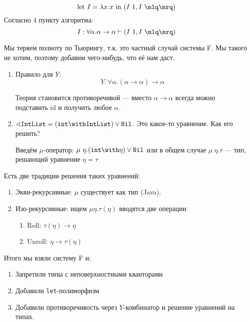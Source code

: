 \begin{example}
    \[\mathrm{let}\ I = \lambda x.x\ \mathrm{in}\ (I\ 1, I\ \mlq\mrq)\]
    Согласно 4 пункту алгоритма:
    \[I : \forall \alpha.\alpha \to \alpha \vdash (I\ 1, I\ \mlq\mrq)\]
\end{example}

Мы теряем полноту по Тьюрингу, т.к. это частный случай системы F. Мы такого не хотим, поэтому добавим чего-нибудь, что её нам даст.

\begin{enumerate}
    \item Правило для \(Y\):
          \[Y : \forall \alpha.(\alpha \to \alpha) \to \alpha\]

          Теория становится противоречивой --- вместо \(\alpha \to \alpha\) всегда можно подставить \(\mathrm{id}\) и получить любое \(\alpha\).

    \item \(\sphericalangle \texttt{IntList} = (\texttt{int} \with \texttt{IntList}) \lor \texttt{Nil}\). Это какое-то уравнение. Как его решить?

          Введём \(\mu\)-оператор: \(\mu\ \eta.(\texttt{int} \with \eta) \lor \texttt{Nil}\) или в общем случае \(\mu\ \eta.\tau\) --- тип, решающий уравнение \(\eta = \tau\)
\end{enumerate}

Есть две традиции решения таких уравнений:
\begin{enumerate}
    \item Экви-рекурсивные: \(\mu\) существует как тип (Java).
    \item Изо-рекурсивные: ищем \(\mu \eta.\tau(\eta)\) вводятся две операции
          \begin{enumerate}
              \item Roll: \(\tau(\eta) \to \eta\)
              \item Unroll: \(\eta \to \tau(\eta)\)
          \end{enumerate}
\end{enumerate}

Итого мы взяли систему F и:
\begin{enumerate}
    \item Запретили типы с неповерхностными кванторами
    \item Добавили \texttt{let}-полиморфизм
    \item Добавили противоречивость через \(Y\)-комбинатор и решение уравнений на типах.
\end{enumerate}
